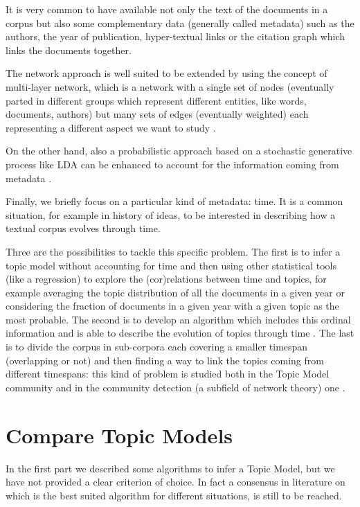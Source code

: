 \documentclass[11pt, a4paper, oneside, openright]{book}
\begin{document}
It is very common to have available not only the text of the documents in a corpus but also some complementary data (generally called metadata) such as the authors, the year of publication, hyper-textual links or the citation graph which links the documents together. 

The network approach is well suited to be extended by using the concept of multi-layer network, which is a network with a single set of nodes (eventually parted in different groups which represent different entities, like words, documents, authors) but many sets of edges (eventually weighted) each representing a different aspect we want to study \parencite{hyland2021}. 

On the other hand, also a probabilistic approach based on a stochastic generative process like LDA can be enhanced to account for the information coming from metadata \parencite{rabinovich2014}.

Finally, we briefly focus on a particular kind of metadata: time. It is a common situation, for example in history of ideas, to be interested in describing how a textual corpus evolves through time.

Three are the possibilities to tackle this specific problem. The first is to infer a topic model without accounting for time and then using other statistical tools (like a regression) to explore the (cor)relations between time and topics, for example averaging the topic distribution of all the documents in a given year or considering the fraction of documents in a given year with a given topic as the most probable. The second is to develop an algorithm which includes this ordinal information and is able to describe the evolution of topics through time \parencite[e.g.][]{bleiDynamicTopicModels2006}. The last is to divide the corpus in sub-corpora each covering a smaller timespan (overlapping or not) and then finding a way to link the topics coming from different timespans: this kind of problem is studied both in the Topic Model community \parencite[e.g.][]{dicaroBimodalNetworkApproach2017} and in the community detection (a subfield of network theory) one \parencite[e.g.][]{rosvall2010}.

\chapter{Compare Topic Models}
In the first part we described some algorithms to infer a Topic Model, but we have not provided a clear criterion of choice. In fact a consensus in literature on which is the best suited algorithm for different situations, is still to be reached.
\end{document}
